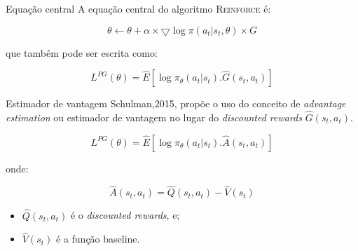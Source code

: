 \documentclass{beamer}
\begin{document}
\begin{frame}{Equação central}
	A equação central do algoritmo \textsc{Reinforce} é: 
	
	\begin{equation}
		\theta \leftarrow \theta + \alpha \times \bigtriangledown \log \pi(a_{t}|s_{t}, \theta) \times G
	\end{equation}

	que também pode ser escrita como: 
	
	\begin{equation}
		L^{PG}(\theta) = \hat{E} \left[ \log \pi_{\theta}(a_{t}|s_{t}).\hat{G}(s_{t},a_{t}) \right]
	\end{equation}
\end{frame}

\begin{frame}{Estimador de vantagem}
	Schulman,2015, propõe o uso do conceito de \textit{advantage estimation} ou estimador de vantagem no lugar do \textit{discounted rewards} $\hat{G}(s_{t},a_{t})$. 
	
	\begin{equation}
	L^{PG}(\theta) = \hat{E} \left[ \log \pi_{\theta}(a_{t}|s_{t}).\hat{A}(s_{t},a_{t}) \right]
	\end{equation}	
	
	onde: 
	
	\begin{equation}
		\hat{A}(s_{t},a_{t}) = \hat{Q}(s_{t},a_{t}) - \hat{V}(s_{t})
	\end{equation}

\begin{itemize}
	\item $\hat{Q}(s_{t},a_{t})$ é o \textit{discounted rewards}, e;
	\item $\hat{V}(s_{t})$ é a função baseline.
\end{itemize}	

\end{frame}


\end{document}
